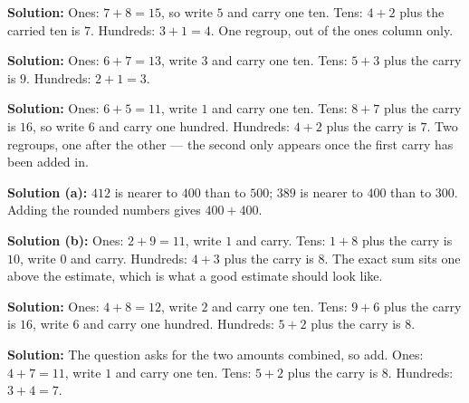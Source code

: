\documentclass[12pt]{article}
\begin{document}




\textbf{Solution:} Ones: $7 + 8 = 15$, so write $5$ and carry one ten. Tens: $4 + 2$ plus the carried ten is $7$. Hundreds: $3 + 1 = 4$. One regroup, out of the ones column only. 


\textbf{Solution:} Ones: $6 + 7 = 13$, write $3$ and carry one ten. Tens: $5 + 3$ plus the carry is $9$. Hundreds: $2 + 1 = 3$. 


\textbf{Solution:} Ones: $6 + 5 = 11$, write $1$ and carry one ten. Tens: $8 + 7$ plus the carry is $16$, so write $6$ and carry one hundred. Hundreds: $4 + 2$ plus the carry is $7$. Two regroups, one after the other --- the second only appears once the first carry has been added in. 


\textbf{Solution (a):} $412$ is nearer to $400$ than to $500$; $389$ is nearer to $400$ than to $300$. Adding the rounded numbers gives $400 + 400$. 

\textbf{Solution (b):} Ones: $2 + 9 = 11$, write $1$ and carry. Tens: $1 + 8$ plus the carry is $10$, write $0$ and carry. Hundreds: $4 + 3$ plus the carry is $8$. The exact sum sits one above the estimate, which is what a good estimate should look like. 


\textbf{Solution:} Ones: $4 + 8 = 12$, write $2$ and carry one ten. Tens: $9 + 6$ plus the carry is $16$, write $6$ and carry one hundred. Hundreds: $5 + 2$ plus the carry is $8$. 


\textbf{Solution:} The question asks for the two amounts combined, so add. Ones: $4 + 7 = 11$, write $1$ and carry one ten. Tens: $5 + 2$ plus the carry is $8$. Hundreds: $3 + 4 = 7$. 

\end{document}
